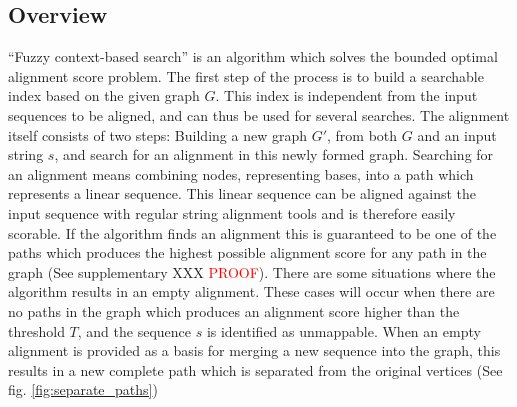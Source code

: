\documentclass{article}
\begin{document}
\subsection{Overview}
``Fuzzy context-based search'' is an algorithm which solves the bounded optimal alignment score problem. The first step of the process is to build a searchable index based on the given graph $G$. This index is independent from the input sequences to be aligned, and can thus be used for several searches. The alignment itself consists of two steps: Building a new graph $G'$, from both $G$ and an input string $s$, and search for an alignment in this newly formed graph. Searching for an alignment means combining nodes, representing bases, into a path which represents a linear sequence. This linear sequence can be aligned against the input sequence with regular string alignment tools and is therefore easily scorable. If the algorithm finds an alignment this is guaranteed to be one of the paths which produces the highest possible alignment score for any path in the graph (See supplementary XXX \textcolor{red}{PROOF}). There are some situations where the algorithm results in an empty alignment. These cases will occur when there are no paths in the graph which produces an alignment score higher than the threshold $T$, and the sequence $s$ is identified as unmappable. When an empty alignment is provided as a basis for merging a new sequence into the graph, this results in a new complete path which is separated from the original vertices (See fig. \ref{fig:separate_paths})
\end{document}
